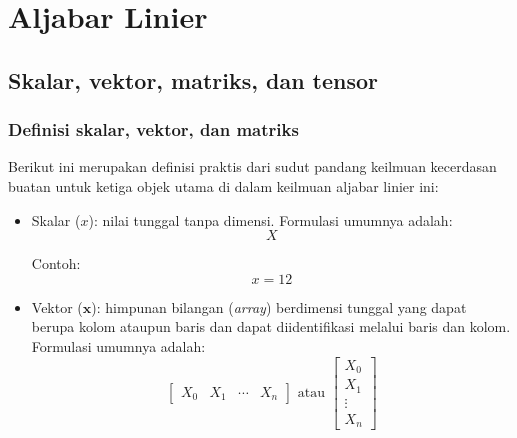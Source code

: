 \chapter{Aljabar Linier}

\section{Skalar, vektor, matriks, dan tensor}
\subsection{Definisi skalar, vektor, dan matriks}
Berikut ini merupakan definisi praktis dari sudut pandang keilmuan kecerdasan buatan untuk ketiga objek utama di dalam keilmuan aljabar linier ini:
\begin{itemize}
    \item Skalar ($x$): nilai tunggal tanpa dimensi. Formulasi umumnya adalah:
    \begin{equation}\label{eqn:eqn1}
        X
    \end{equation}
    
    Contoh:
    \begin{equation*}
        x = 12
    \end{equation*}
    \item Vektor ($\mathbf{x}$): himpunan bilangan (\textit{array}) berdimensi tunggal yang dapat berupa kolom ataupun baris dan dapat diidentifikasi melalui baris dan kolom.  Formulasi umumnya adalah: 
    \begin{equation}\label{eqn:eqn2}
        \begin{bmatrix}X_{0} & X_{1} & \cdots &  X_{n}\end{bmatrix} \text{ atau } \begin{bmatrix}X_{0} \\ X_{1} \\ \vdots \\ X_{n}\end{bmatrix}
    \end{equation}
    

\end{itemize}
